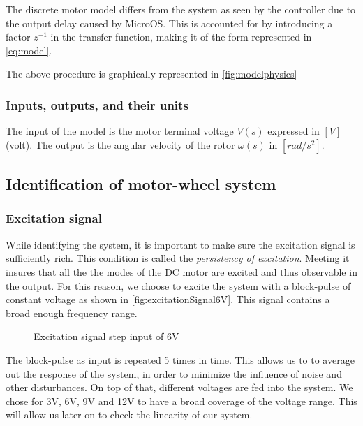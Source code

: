 \documentclass[a4paper]{article}
\newcommand{\newpar}{\vspace{.3cm}\noindent}
\begin{document}
\newpar
The discrete motor model differs from the system as seen by the controller due to the output delay caused by MicroOS. This is accounted for by introducing a factor \(z^{-1}\) in the transfer function, making it of the form represented in \autoref{eq:model}.

\newpar
The above procedure is graphically represented in \autoref{fig:modelphysics}


\subsubsection{Inputs, outputs, and their units}
The input of the model is the motor terminal voltage \(V(s)\) expressed in \([V]\) (volt). The output is the angular velocity of the rotor \(\omega(s)\) in \([rad/s^2]\).

\subsection{Identification of motor-wheel system} \label{motor-wheel}
\subsubsection{Excitation signal}

While identifying the system, it is important to make sure the excitation signal is sufficiently rich. This condition is called the \emph{persistency of excitation}. Meeting it insures that all the the modes of the DC motor are excited and thus observable in the output. For this reason, we choose to excite the system with a block-pulse of constant voltage as shown in \autoref{fig:excitationSignal6V}. This signal contains a broad enough frequency range.

  \begin{figure}[H]
      \caption{Excitation signal step input of 6V}
      \label{fig:excitationSignal6V}
  \end{figure}

\newpar
The block-pulse as input is repeated 5 times in time. This allows us to to average out the response of the system, in order to minimize the influence of noise and other disturbances. On top of that, different voltages are fed into the system. We chose for 3V, 6V, 9V and 12V to have a broad coverage of the voltage range. This will allow us later on to check the linearity of our system. 
\end{document}
